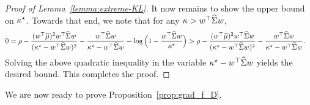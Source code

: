 \documentclass{article}
\begin{document}
\begin{proof}[Proof of Lemma~\ref{lemma:extreme-KL}]
	It now remains to show the upper bound on $\kappa^\star$. Towards that end, we note that for any $\kappa > w^\top \widehat{\Sigma} w$, 
	\begin{align*}
	    0 &  = \rho - \frac{(w^\top \widehat {\mu})^2 w^\top \widehat{\Sigma} w}{(\kappa^\star - w^\top \widehat{\Sigma} w)^2} - \frac{w^\top \widehat{\Sigma} w}{\kappa^\star - w^\top \widehat{\Sigma} w} - \log\Big( 1 - \frac{w^\top \widehat{\Sigma} w}{\kappa^\star}\Big)  > \rho - \frac{(w^\top \widehat {\mu})^2 w^\top \widehat{\Sigma} w}{(\kappa^\star - w^\top \widehat{\Sigma} w)^2} - \frac{w^\top \widehat{\Sigma} w}{\kappa^\star - w^\top \widehat{\Sigma} w}.
	\end{align*}
	Solving the above quadratic inequality in the variable $\kappa^\star - w^\top \widehat{\Sigma} w$ yields the desired bound. This completes the proof.
\end{proof}

We are now ready to prove Proposition~\ref{prop:grad_f_D}.
\end{document}
